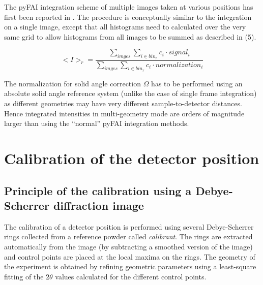 \documentclass[preprint]{iucr}              %
\begin{document}
The pyFAI integration scheme of multiple images taken at various positions has
first been reported in . 
The procedure is conceptually similar to the integration on a single image,
except that all histograms need to calculated over the very same
grid to allow histograms from all images to be summed as described in (5). 

\begin{equation}
<I>_{r} = \frac{\sum\limits_{imges} \sum\limits_{i \in bin_r} c_i \cdot
signal_i} {\sum\limits_{imges} \sum\limits_{i \in bin_r} c_i \cdot
normalization_i} 
\end{equation}

The normalization for solid angle correction $\Omega$ has to be performed
using an absolute solid angle reference system (unlike the case of single
frame integration) as different geometries may have very different
sample-to-detector distances.
Hence integrated intensities in multi-geometry mode are orders of
magnitude larger than using the ``normal'' pyFAI integration methods.

\section{Calibration of the detector position}

\subsection{Principle of the calibration using a Debye-Scherrer diffraction
image}
The calibration of a detector position is performed using several Debye-Scherrer
rings collected from a reference powder called \textit{calibrant}.
The rings are extracted automatically from the image (by subtracting a smoothed 
version of the image) and control points are placed at the
local maxima on the rings.
The geometry of the experiment is obtained by refining geometric parameters using 
a least-square fitting of the $2\theta$ values calculated for the different control points.
\end{document}
